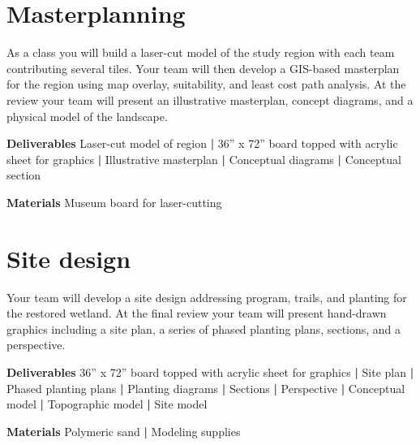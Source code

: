 \documentclass[11pt,article,oneside]{memoir}
\begin{document}
\section{Masterplanning}
As a class you will build a laser-cut model of the study region 
with each team contributing several tiles. 
Your team will then develop a GIS-based masterplan for the region 
using map overlay, suitability, and least cost path analysis. 
At the review your team will present
an illustrative masterplan, concept diagrams,
and a physical model of the landscape.

\vspace*{0.5em} 
\noindent \textbf{Deliverables} 
Laser-cut model of region \textbf{|} 
36'' x 72'' board topped with acrylic sheet for graphics \textbf{|}
Illustrative masterplan \textbf{|} 
Conceptual diagrams \textbf{|}
Conceptual section

\vspace*{0.5em} 
\noindent \textbf{Materials} 
Museum board for laser-cutting

\section{Site design}
Your team will develop a site design
addressing program, trails, and planting
for the restored wetland.
At the final review your team will present hand-drawn graphics including
a site plan, a series of phased planting plans,
sections, and a perspective.

\vspace*{0.5em} 
\noindent \textbf{Deliverables} 
36'' x 72'' board topped with acrylic sheet for graphics \textbf{|}
Site plan \textbf{|}
Phased planting plans \textbf{|}
Planting diagrams \textbf{|}
Sections \textbf{|}
Perspective \textbf{|}
Conceptual model \textbf{|}
Topographic model \textbf{|}
Site model

\vspace*{0.5em} 
\noindent \textbf{Materials} 
Polymeric sand \textbf{|} Modeling supplies

\end{document}
